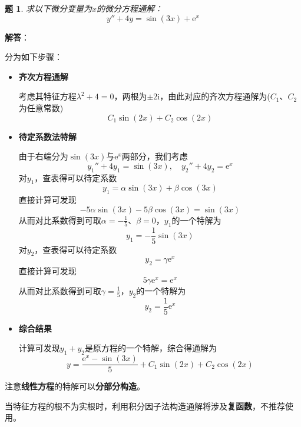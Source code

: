 \documentclass[a4paper,UTF8,fontset=windows,AutoFakeBold]{ctexart}
\newcommand*{\er}{\mathrm{e}}
\newcommand*{\ir}{\mathrm{i}}
\newcommand*{\note}{\noindent *}
\theoremstyle{ex}
\newtheorem{exercise}{题}
\newcommand{\sol}[1]{{\vspace{5pt}\kaishu\noindent\textbf{解答}：\vspace{-3pt}
\begin{compactitem}
    \item[] #1
\end{compactitem}
}}
\begin{document}
\begin{framed}
\begin{exercise}
    求以下微分变量为$x$的微分方程通解：
    $$y''+4y=\sin(3x)+\er^x$$
\end{exercise}
\sol{
    分为如下步骤：
    \begin{itemize}
        \item \textbf{齐次方程通解}
        
        考虑其特征方程$\lambda^2+4=0$，两根为$\pm2\ir$，由此对应的齐次方程通解为($C_1$、$C_2$为任意常数)
        $$C_1\sin(2x)+C_2\cos(2x)$$
        
        \item \textbf{待定系数法特解}
        
        由于右端分为$\sin(3x)$与$\er^x$两部分，我们考虑
        $$y_1''+4y_1=\sin(3x),\quad y_2''+4y_2=\er^x$$
        对$y_1$，查表得可以待定系数
        $$y_1=\alpha\sin(3x)+\beta\cos(3x)$$
        直接计算可发现
        $$-5\alpha\sin(3x)-5\beta\cos(3x)=\sin(3x)$$
        从而对比系数得到可取$\alpha=-\frac{1}{5}$、$\beta=0$，$y_1$的一个特解为
        $$y_1=-\frac{1}{5}\sin(3x)$$
        对$y_2$，查表得可以待定系数
        $$y_2=\gamma\er^x$$
        直接计算可发现
        $$5\gamma\er^x=\er^x$$
        从而对比系数得到可取$\gamma=\frac{1}{5}$，$y_2$的一个特解为
        $$y_2=\frac{1}{5}\er^x$$

        \item \textbf{综合结果}

        计算可发现$y_1+y_2$是原方程的一个特解，综合得通解为
        $$y=\frac{\er^x-\sin(3x)}{5}+C_1\sin(2x)+C_2\cos(2x)$$
    \end{itemize}
}
\end{framed}

\note 注意\textbf{线性方程}的特解可以\textbf{分部分构造}。

\note 当特征方程的根不为实根时，利用积分因子法构造通解将涉及\textbf{复函数}，不推荐使用。
\end{document}
